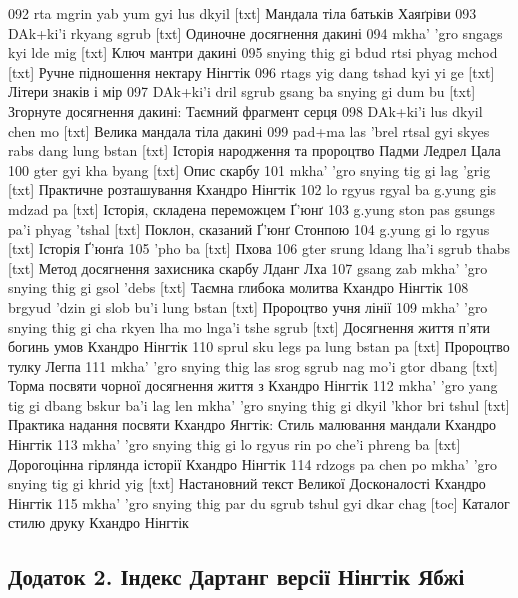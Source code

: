 \documentclass{article}
\begin{document}
092 rta mgrin yab yum gyi lus dkyil [txt] Мандала тіла батьків Хаяґріви
093 DAk+ki'i rkyang sgrub [txt] Одиночне досягнення дакині
094 mkha' 'gro sngags kyi lde mig [txt] Ключ мантри дакині
095 snying thig gi bdud rtsi phyag mchod [txt] Ручне підношення нектару Нінгтік
096 rtags yig dang tshad kyi yi ge [txt] Літери знаків і мір
097 DAk+ki'i dril sgrub gsang ba snying gi dum bu [txt] Згорнуте досягнення дакині: Таємний фрагмент серця
098 DAk+ki'i lus dkyil chen mo [txt] Велика мандала тіла дакині
099 pad+ma las 'brel rtsal gyi skyes rabs dang lung bstan [txt] Історія народження та пророцтво Падми Ледрел Цала
100 gter gyi kha byang [txt] Опис скарбу
101 mkha' 'gro snying tig gi lag 'grig [txt] Практичне розташування Кхандро Нінгтік
102 lo rgyus rgyal ba g.yung gis mdzad pa [txt] Історія, складена переможцем Ґ'юнґ
103 g.yung ston pas gsungs pa'i phyag 'tshal [txt] Поклон, сказаний Ґ'юнґ Стонпою
104 g.yung gi lo rgyus [txt] Історія Ґ'юнґа
105 'pho ba [txt] Пхова
106 gter srung ldang lha'i sgrub thabs [txt] Метод досягнення захисника скарбу Лданг Лха
107 gsang zab mkha' 'gro snying thig gi gsol 'debs [txt] Таємна глибока молитва Кхандро Нінгтік
108 brgyud 'dzin gi slob bu'i lung bstan [txt] Пророцтво учня лінії
109 mkha' 'gro snying thig gi cha rkyen lha mo lnga'i tshe sgrub [txt] Досягнення життя п'яти богинь умов Кхандро Нінгтік
110 sprul sku legs pa lung bstan pa [txt] Пророцтво тулку Легпа
111 mkha' 'gro snying thig las srog sgrub nag mo'i gtor dbang [txt] Торма посвяти чорної досягнення життя з Кхандро Нінгтік
112 mkha' 'gro yang tig gi dbang bskur ba'i lag len mkha' 'gro snying thig gi dkyil 'khor bri tshul [txt] Практика надання посвяти Кхандро Янгтік: Стиль малювання мандали Кхандро Нінгтік
113 mkha' 'gro snying thig gi lo rgyus rin po che'i phreng ba [txt] Дорогоцінна гірлянда історії Кхандро Нінгтік
114 rdzogs pa chen po mkha' 'gro snying tig gi khrid yig [txt] Настановний текст Великої Досконалості Кхандро Нінгтік
115 mkha' 'gro snying thig par du sgrub tshul gyi dkar chag [toc] Каталог стилю друку Кхандро Нінгтік

\newpage
\subsection{Додаток 2. Індекс Дартанг версії Нінгтік Ябжі}
\end{document}
